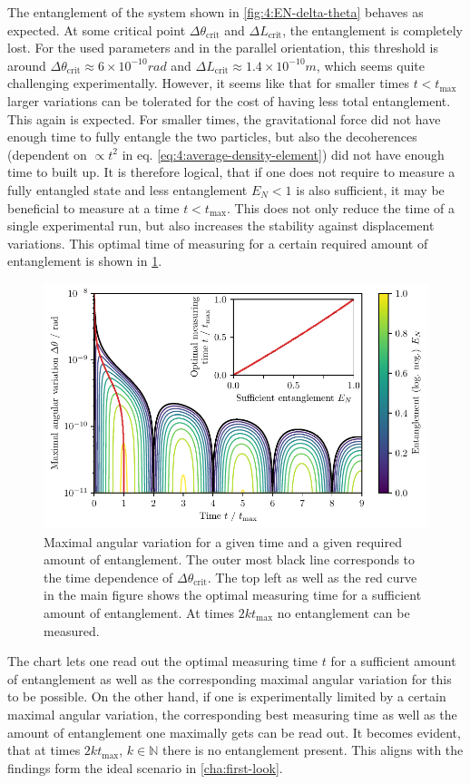 The entanglement of the system shown in \cref{fig:4:EN-delta-theta} behaves as expected. At some critical point $\Delta \theta_\mathrm{crit}$ and $\Delta L_\mathrm{crit}$, the entanglement is completely lost.
For the used parameters and in the parallel orientation, this threshold is around $\Delta \theta_\mathrm{crit} \approx 6 \times 10^{-10} \si{rad}$ and $\Delta L_\mathrm{crit} \approx 1.4 \times 10^{-10} \si{m}$, which seems quite challenging experimentally.
However, it seems like that for smaller times $t<t_\mathrm{max}$ larger variations can be tolerated for the cost of having less total entanglement.
This again is expected. For smaller times, the gravitational force did not have enough time to fully entangle the two particles, but also the decoherences (dependent on $\propto t^2$ in eq. \eqref{eq:4:average-density-element}) did not have enough time to built up. 
It is therefore logical, that if one does not require to measure a fully entangled state and less entanglement $E_N < 1$ is also sufficient, it may be beneficial to measure at a time $t < t_\mathrm{max}$. 
This does not only reduce the time of a single experimental run, but also increases the stability against displacement variations. This optimal time of measuring for a certain required amount of entanglement is shown in \cref{fig:4:time-delta-theta}.
\begin{figure}[!htb]
  \centering
  \includegraphics[width=\textwidth]{./../figures/theta-variance/time-delta-theta-crit-EN.pdf}
  \caption{Maximal angular variation for a given time and a given required amount of entanglement. The outer most black line corresponds to the time dependence of $\Delta \theta_\mathrm{crit}$. The top left as well as the red curve in the main figure shows the optimal measuring time for a sufficient amount of entanglement.
  At times $2k t_\mathrm{max}$ no entanglement can be measured.}
  \label{fig:4:time-delta-theta}
\end{figure}
The chart lets one read out the optimal measuring time $t$ for a sufficient amount of entanglement as well as the corresponding maximal angular variation for this to be possible.
On the other hand, if one is experimentally limited by a certain maximal angular variation, the corresponding best measuring time as well as the amount of entanglement one maximally gets can be read out.
It becomes evident, that at times $2k t_\mathrm{max}$, $k\in\mathbb{N}$ there is no entanglement present.
This aligns with the findings form the ideal scenario in \cref{cha:first-look}. 